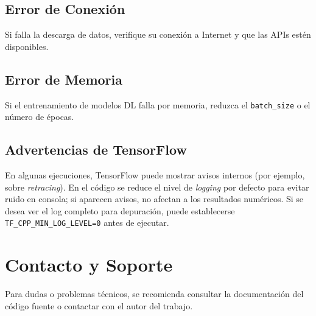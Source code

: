 \subsection{Error de Conexión}
Si falla la descarga de datos, verifique su conexión a Internet y que las APIs estén disponibles.

\subsection{Error de Memoria}
Si el entrenamiento de modelos DL falla por memoria, reduzca el \texttt{batch\_size} o el número de épocas.

\subsection{Advertencias de TensorFlow}
En algunas ejecuciones, TensorFlow puede mostrar avisos internos (por ejemplo, sobre \textit{retracing}). En el código se reduce el nivel de \textit{logging} por defecto para evitar ruido en consola; si aparecen avisos, no afectan a los resultados numéricos. Si se desea ver el log completo para depuración, puede establecerse \texttt{TF\_CPP\_MIN\_LOG\_LEVEL=0} antes de ejecutar.

\section{Contacto y Soporte}

Para dudas o problemas técnicos, se recomienda consultar la documentación del código fuente o contactar con el autor del trabajo.
